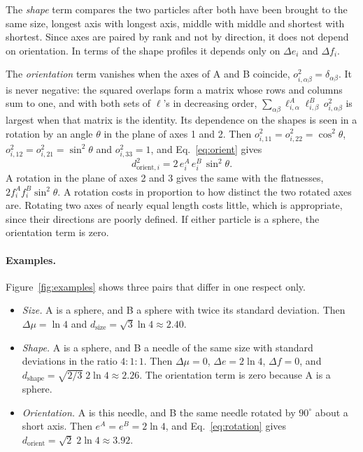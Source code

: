 \documentclass[11pt,a4paper]{article}
\newcommand{\dorient}{d_{\mathrm{orient},i}}
\begin{document}
The \emph{shape} term compares the two particles after both have been brought to the same size, longest axis with longest axis, middle with middle and shortest with shortest. Since axes are paired by rank and not by direction, it does not depend on orientation. In terms of the shape profiles it depends only on $\Delta e_i$ and $\Delta f_i$.

The \emph{orientation} term vanishes when the axes of A and B coincide, $o^2_{i,\alpha\beta} = \delta_{\alpha\beta}$. It is never negative: the squared overlaps form a matrix whose rows and columns sum to one, and with both sets of $\ell$'s in decreasing order, $\sum_{\alpha\beta}\ell^A_{i,\alpha}\ell^B_{i,\beta}\,o^2_{i,\alpha\beta}$ is largest when that matrix is the identity. Its dependence on the shapes is seen in a rotation by an angle $\theta$ in the plane of axes 1 and 2. Then $o^2_{i,11} = o^2_{i,22} = \cos^2\theta$, $o^2_{i,12} = o^2_{i,21} = \sin^2\theta$ and $o^2_{i,33} = 1$, and Eq.~\eqref{eq:orient} gives
\begin{equation}
\label{eq:rotation}
\dorient^2 = 2\, e^A_i\, e^B_i\,\sin^2\theta .
\end{equation}
A rotation in the plane of axes 2 and 3 gives the same with the flatnesses, $2 f^A_i f^B_i\sin^2\theta$. A rotation costs in proportion to how distinct the two rotated axes are. Rotating two axes of nearly equal length costs little, which is appropriate, since their directions are poorly defined. If either particle is a sphere, the orientation term is zero.

\paragraph{Examples.} Figure~\ref{fig:examples} shows three pairs that differ in one respect only.
\begin{itemize}
\item \emph{Size.} A is a sphere, and B a sphere with twice its standard deviation. Then $\Delta\mu = \ln 4$ and $d_\mathrm{size} = \sqrt3\ln 4 \approx 2.40$.
\item \emph{Shape.} A is a sphere, and B a needle of the same size with standard deviations in the ratio $4{:}1{:}1$. Then $\Delta\mu = 0$, $\Delta e = 2\ln 4$, $\Delta f = 0$, and $d_\mathrm{shape} = \sqrt{2/3}\;2\ln4 \approx 2.26$. The orientation term is zero because A is a sphere.
\item \emph{Orientation.} A is this needle, and B the same needle rotated by $90^\circ$ about a short axis. Then $e^A = e^B = 2\ln 4$, and Eq.~\eqref{eq:rotation} gives $d_\mathrm{orient} = \sqrt2\;2\ln4 \approx 3.92$.
\end{itemize}
\end{document}
